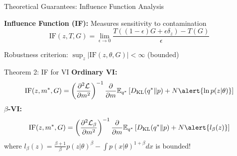 \documentclass[aspectratio=169, 12pt]{beamer}
\begin{document}
\begin{frame}{Theoretical Guarantees: Influence Function Analysis}

\textbf{Influence Function (IF):} Measures sensitivity to contamination
\[
\text{IF}(z, T, G) = \lim_{\epsilon \to 0} \frac{T((1-\epsilon)G + \epsilon\delta_z) - T(G)}{\epsilon}
\]

\alert{Robustness criterion:} $\sup_z |\text{IF}(z, \theta, G)| < \infty$ (bounded)


\begin{block}{Theorem 2: IF for VI}
\textbf{Ordinary VI:}
\vspace{-0.4cm}
\[
\text{IF}(z, m^*, G) = \left(\frac{\partial^2 \mathcal{L}}{\partial m^2}\right)^{-1} \frac{\partial}{\partial m}\mathbb{E}_{q^*}\left[D_{\text{KL}}(q^* \| p) + N \alert{\ln p(z|\theta)}\right]
\]
\vspace{-0.4cm}
\textbf{$\beta$-VI:}
\[
\text{IF}(z, m^*, G) = \left(\frac{\partial^2 \mathcal{L}_\beta}{\partial m^2}\right)^{-1} \frac{\partial}{\partial m}\mathbb{E}_{q^*}\left[D_{\text{KL}}(q^* \| p) + N \alert{l_\beta(z)}\right]
\]
where $l_\beta(z) = \frac{\beta+1}{\beta}p(z|\theta)^\beta - \int p(x|\theta)^{1+\beta}dx$ is \alert{bounded}!
\end{block}

\end{frame}
\end{document}
